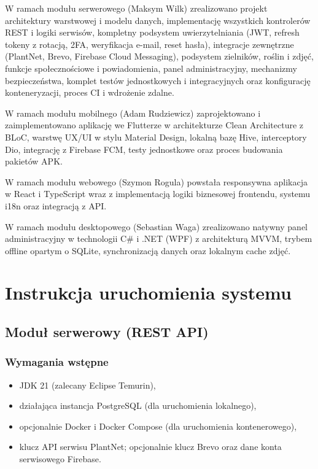 \documentclass[12pt,a4paper]{article}
\begin{document}
W ramach modu\l{}u serwerowego (Maksym Wilk) zrealizowano projekt architektury warstwowej i modelu danych, implementacj\k{e} wszystkich kontroler\'ow REST i logiki serwis\'ow, kompletny podsystem uwierzytelniania (JWT, refresh tokeny z rotacj\k{a}, 2FA, weryfikacja e-mail, reset has\l{}a), integracje zewn\k{e}trzne (PlantNet, Brevo, Firebase Cloud Messaging), podsystem zielnik\'ow, ro\'slin i zdj\k{e}\'c, funkcje spo\l{}eczno\'sciowe i powiadomienia, panel administracyjny, mechanizmy bezpiecze\'nstwa, komplet test\'ow jednostkowych i integracyjnych oraz konfiguracj\k{e} konteneryzacji, proces CI i wdro\.zenie zdalne.

W ramach modu\l{}u mobilnego (Adam Rudziewicz) zaprojektowano i zaimplementowano aplikacj\k{e} we Flutterze w architekturze Clean Architecture z BLoC, warstw\k{e} UX/UI w stylu Material Design, lokaln\k{a} baz\k{e} Hive, interceptory Dio, integracj\k{e} z Firebase FCM, testy jednostkowe oraz proces budowania pakiet\'ow APK.

W ramach modu\l{}u webowego (Szymon Rogula) powsta\l{}a responsywna aplikacja w React i TypeScript wraz z implementacj\k{a} logiki biznesowej frontendu, systemu i18n oraz integracj\k{a} z API.

W ramach modu\l{}u desktopowego (Sebastian Waga) zrealizowano natywny panel administracyjny w technologii C\# i .NET (WPF) z architektur\k{a} MVVM, trybem offline opartym o SQLite, synchronizacj\k{a} danych oraz lokalnym cache zdj\k{e}\'c.

\section{Instrukcja uruchomienia systemu}

\subsection{Modu\l{} serwerowy (REST API)}

\subsubsection{Wymagania wst\k{e}pne}

\begin{itemize}[label=\textbullet, leftmargin=1.5cm]
    \item JDK 21 (zalecany Eclipse Temurin),
    \item dzia\l{}aj\k{a}ca instancja PostgreSQL (dla uruchomienia lokalnego),
    \item opcjonalnie Docker i Docker Compose (dla uruchomienia kontenerowego),
    \item klucz API serwisu PlantNet; opcjonalnie klucz Brevo oraz dane konta serwisowego Firebase.
\end{itemize}
\end{document}
